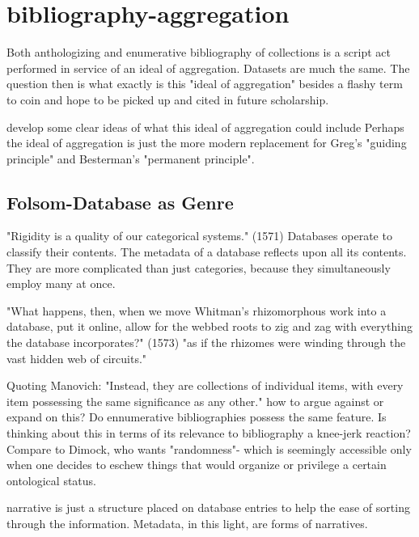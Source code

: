\documentclass[course, english]{Notes}
\newcommand{\n}{\scalebox{2}{\textbf{\framebox{$\aleph$} } } }
\begin{document}
{\begin{outline}
\end{outline}
	
\section{bibliography-aggregation}	

\begin{outline}
 \1 Both anthologizing and enumerative bibliography of collections is a script act performed in service of an ideal of aggregation. Datasets are much the same. The question then is what exactly is this "ideal of aggregation" besides a flashy term to coin and hope to be picked up and cited in future scholarship.
	
 \1 develop some clear ideas of what this ideal of aggregation could include
 	\2 Perhaps the ideal of aggregation is just the more modern replacement for Greg's "guiding principle" and Besterman's "permanent principle". 
\end{outline}
 	
\subsection{Folsom-Database as Genre}
\begin{outline}	
\1 "Rigidity is a quality of our categorical systems." (1571)
	\2 \n Databases operate to classify their contents. The metadata of a database reflects upon all its contents. They are more complicated than just categories, because they simultaneously employ many at once. 


\1 "What happens, then, when we move Whitman's rhizomorphous work into a database, put it online, allow for the webbed roots to zig and zag with everything the database incorporates?" (1573)
	\2 "as if the rhizomes were winding through the vast hidden web of circuits."
	
\1 Quoting Manovich: "Instead, they are collections of individual items, with every item possessing the same significance as any other." 
	\2 \n how to argue against or expand on this? Do ennumerative bibliographies possess the same feature. 
		\3 Is thinking about this in terms of its relevance to bibliography a knee-jerk reaction? 
		\3 Compare to Dimock, who wants "randomness"- which is seemingly accessible only when one decides to eschew things that would organize or privilege a certain ontological status. 	
		
\1 \n narrative is just a structure placed on database entries to help the ease of sorting through the information. Metadata, in this light, are forms of narratives. 


\end{outline}}
\end{document}
